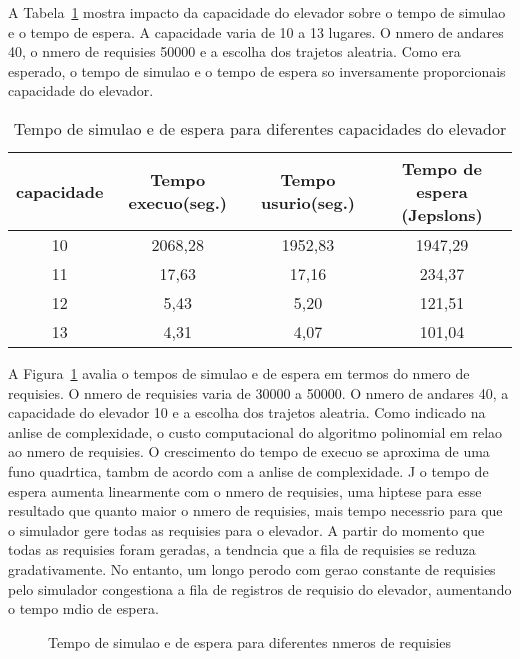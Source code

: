 \documentclass[12pt]{article}
\begin{document}
A Tabela~\ref{tempo_capacidade_elevador} mostra impacto da capacidade do elevador sobre o tempo de simulao e o tempo de espera. A capacidade varia de 10 a 13 lugares. O nmero de andares  40, o nmero de requisies  50000 e a escolha dos trajetos  aleatria. Como era esperado, o tempo de simulao e o tempo de espera so inversamente proporcionais  capacidade do elevador.

\begin{table}[ht!]
\centering
\begin{footnotesize}
\begin{tabular}{|c|c|c|c|}
\hline
\textbf{capacidade}              		& \textbf{Tempo execuo(seg.)} & \textbf{Tempo usurio(seg.)}      & \textbf{Tempo de espera (Jepslons)}\\ \hline
10	& 2068,28	& 1952,83	& 1947,29\\ \hline
11	& 17,63		& 17,16		& 234,37\\ \hline
12	& 5,43		& 5,20		& 121,51\\ \hline
13	& 4,31		& 4,07		& 101,04\\ \hline
\end{tabular}
\end{footnotesize}
\caption{Tempo de simulao e de espera para diferentes capacidades do elevador \label{tempo_capacidade_elevador}}
\end{table}

A Figura~\ref{tempo_n_requisicoes} avalia o tempos de simulao e de espera em termos do nmero de requisies. O nmero de requisies varia de 30000 a 50000. O nmero de andares  40, a capacidade do elevador  10 e a escolha dos trajetos  aleatria. Como indicado na anlise de complexidade, o custo computacional do algoritmo  polinomial em relao ao nmero de requisies. O crescimento do tempo de execuo se aproxima de uma funo quadrtica, tambm de acordo com a anlise de complexidade. J o tempo de espera aumenta linearmente com o nmero de requisies, uma hiptese para esse resultado  que quanto maior o nmero de requisies, mais tempo  necessrio para que o simulador gere todas as requisies para o elevador. A partir do momento que todas as requisies foram geradas, a tendncia  que a fila de requisies se reduza gradativamente. No entanto, um longo perodo com gerao constante de requisies pelo simulador congestiona a fila de registros de requisio do elevador, aumentando o tempo mdio de espera.

\begin{figure}[ht!]
\centering
{}
\caption{Tempo de simulao e de espera para diferentes nmeros de requisies \label{tempo_n_requisicoes}}
\end{figure}
\end{document}
